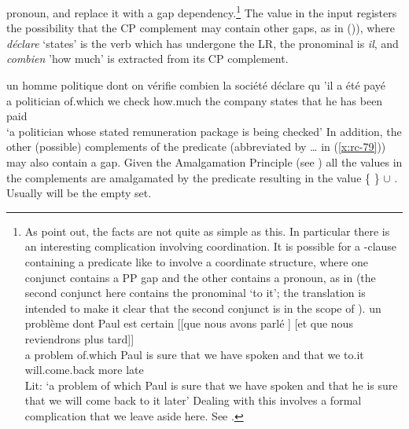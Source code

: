 \documentclass[output=paper
 	        ,biblatex
                ,babelshorthands
                ,newtxmath
                ,draftmode
                ,colorlinks, citecolor=brown
]{langscibook}
\begin{document}
pronoun, and replace it with a gap dependency.\footnote{As \citet{AbeilleGodard07} point
  out, the facts are not quite as simple as this. In particular there is an interesting
  complication involving coordination. It is possible for a -clause containing a
  predicate like  to involve a coordinate structure, where one conjunct
  contains a PP gap and the other contains a pronoun, as in  (the
  second conjunct here contains the pronominal  `to it'; the  translation is
  intended to make it clear that the second conjunct is in the scope of ).
  \ea\label{x:rc-80}
  \gll
    un problème dont     Paul est certain [[que nous avons parlé  \trace] [et que nous  reviendrons plus tard]]\\
    a  problem  of.which Paul is  sure    \hphantom{[[}that we have   spoken {} \hphantom{[}and that we to.it will.come.back more late\\
  \glt Lit: `a problem of which Paul is sure that we have  spoken and that he is sure that we will come back to it later'
  \z
  Dealing with this
  involves a formal complication that we leave aside here. See .}
The \SLASH value  in the input registers the possibility that the CP complement may contain other 
gaps, as in ()), where \emph{déclare} `states' is the verb which has undergone the LR, the pronominal is \emph{il},
and \emph{combien} 'how much' is extracted from its CP complement.  

\ea
\gll un {homme politique} dont     on vérifie combien  la société   déclare qu  'il   a   été  payé\\
     a  politician        of.which we check   how.much the company  states  that he   has been
     paid\\
%
\glt `a politician whose stated remuneration package is being checked'
\z
%
In addition, the other (possible) complements of the predicate (abbreviated by \ldots{} in (\ref{x:rc-79})) may also
contain a gap. Given the \SLASH Amalgamation Principle (see \crossrefchapteralt[\pageref{udc:slash-amalgamation-principle}]{udc})  all the \SLASH values 
in the complements are amalgamated by the predicate resulting in the \SLASH value \{  \} $\cup$
.  Usually  will be the empty set.
%
%
%
\end{document}
